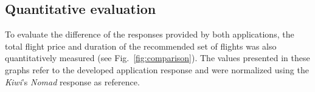 \subsection{Quantitative evaluation}
\label{sec:quantitative_eval}

To evaluate the difference of the responses provided by both applications, the total flight price and duration of the recommended set of flights was also quantitatively measured (see Fig.~\ref{fig:comparison}). The values presented in these graphs refer to the developed application response and were normalized using the \textit{Kiwi}'s \textit{Nomad} response as reference. 



